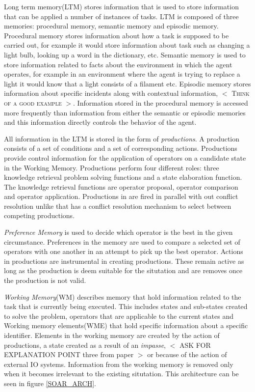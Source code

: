 Long term memory(LTM) stores information that is used to store
information that can be applied a number of instances of tasks. LTM is
composed of three memories: procedural memory, semantic memory and
episodic memory. Procedural memory stores information about how a task
is supposed to be carried out, for example it would store information
about task such as changing a light bulb, looking up a word in the
dictionary, etc. Semantic memory is used to store information related
to facts about the environment in which the agent operates, for
example in an environment where the agent is trying to replace a light
it would know that a light consists of a filament etc. Episodic memory
stores information about specific incidents along with contextual
information, $<$ \textsc{Think of a good example} $>$. Information
stored in the procedural memory is accessed more frequently than
information from either the semantic or episodic memories and this
information directly controls the behavior of the agent. 

All information in the LTM is stored in the form of
\emph{productions}. A production consists of a set of conditions and a
set of corresponding actions. Productions provide control information
for the application of operators on a candidate state in the Working
Memory. Productions perform four different roles: three knowledge
retrieval problem solving functions and a state elaboration
function. The knowledge retrieval functions are operator proposal,
operator comparison and operator
application\cite{Laird:2006aa}. Productions in \soar are fired in
parallel with out conflict resolution unlike \actr that has a conflict
resolution mechanism to select between competing productions.

\emph{Preference Memory} is used to decide which operator is the best in the
given circumstance.  Preferences in the memory are used to compare a
selected set of operators with one another in an attempt to pick up
the best operator. Actions in productions are instrumental in creating
productions. These remain active as long as the production is deem
suitable for the situtation and are removes once the production is not
valid.

\emph{Working Memory}(WM) describes memory that hold information
related to the task that is currently being executed. This includes
states and sub-states created to solve the problem, operators that are
applicable to the current states and Working memory elements(WME) that
hold specific information about a specific identifier. Elements in the
working memory are created by the action of productions, a state
created as a result of an \emph{impasse}, $<$ ASK FOR EXPLANATION
POINT three from paper $>$ or because of the action of external IO
systems. Information from the working memory is removed only when it
becomes irrelevant to the existing situtation. This architecture can
be seen in figure \ref{SOAR_ARCH}.

